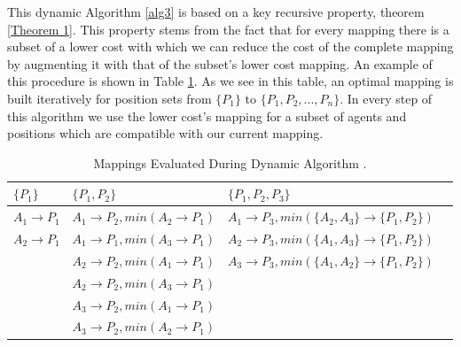 This dynamic Algorithm \ref{alg3} is based on a key recursive property, theorem \ref{Theorem 1}.  This property stems from the fact that for every mapping there is a subset of a lower cost with which we can reduce the cost of the complete mapping by augmenting  it with that of the subset's lower cost mapping. An example of this procedure is shown in Table \ref{tab:DynamicTable}. As we see in this table, an optimal mapping is built iteratively for position sets from $\lbrace P_{1} \rbrace$ to $\lbrace P_{1},P_{2},...,P_{n} \rbrace$. In every step of this algorithm we use the lower cost's mapping for a subset of agents and positions which are compatible with our current mapping.



\begin{table}[htb!]
\label{tab:DynamicTable}
\centering
    \begin{tabular}{ | l | l | l | p{5cm} |}
    \hline
    $\lbrace P_{1} \rbrace$   & $\lbrace P_{1},P_{2} \rbrace$ 	& $\lbrace P_{1},P_{2},P_{3} \rbrace$\\ \hline
    $A_{1} \rightarrow P_{1}$ & $A_{1} \rightarrow P_{2},min(A_{2} \rightarrow P_{1})$	 	& $A_{1} \rightarrow P_{3},min(\lbrace A_{2},A_{3} \rbrace \rightarrow \lbrace P_{1},P_{2} \rbrace)$  \\ \hline
    $A_{2} \rightarrow P_{1}$ & $A_{1} \rightarrow P_{1},min(A_{3} \rightarrow P_{1})$	 	& $A_{2} \rightarrow P_{3},min(\lbrace A_{1},A_{3} \rbrace \rightarrow \lbrace P_{1},P_{2} \rbrace)$  \\ \hline
     						  & $A_{2} \rightarrow P_{2},min(A_{1} \rightarrow P_{1})$ 		& $A_{3} \rightarrow P_{3},min(\lbrace A_{1},A_{2} \rbrace \rightarrow \lbrace P_{1},P_{2} \rbrace)$  \\ \hline
       						  & $A_{2} \rightarrow P_{2},min(A_{3} \rightarrow P_{1})$ 		&   \\ \hline
       						  & $A_{3} \rightarrow P_{2},min(A_{1} \rightarrow P_{1})$ 		&   \\ \hline
    						  & $A_{3} \rightarrow P_{2},min(A_{2} \rightarrow P_{1})$		&   \\
    \hline

    \end{tabular}
    
    \caption{Mappings Evaluated During Dynamic Algorithm \cite{UtAustinVillaPaper}.}    
\end{table}

